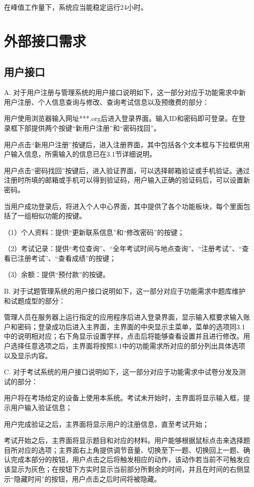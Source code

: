 在峰值工作量下，系统应当能稳定运行24小时。

\section{外部接口需求}

\subsection{用户接口}
A. 对于用户注册与管理系统的用户接口说明如下，这一部分对应于功能需求中新用户注册、个人信息查询与修改、查询考试信息以及预缴费的部分：

用户使用浏览器输入网址***.org后进入登录界面。输入ID和密码即可登录。在登录框下部提供两个按键“新用户注册”和“密码找回”。

用户点击“新用户注册”按键后，进入注册界面，其中包括各个文本框与下拉框供用户输入信息，所需输入的信息已在3.1节详细说明。

用户点击“密码找回”按键后，进入验证界面，可以选择邮箱验证或手机验证。通过注册时所填的邮箱或手机可以得到验证码，用户输入正确的验证码后，可以设置新密码。

当用户成功登录后，将进入个人中心界面，其中提供了各个功能板块，每个里面包括了一组相似功能的按键。

（1）个人资料：提供“更新联系信息”和“修改密码”的按键；
	
（2）考试记录：提供“考位查询”、“全年考试时间与地点查询”、“注册考试”、“查看已注册考试”、“查看成绩”的按键；

（3）余额：提供“预付款”的按键。

B. 对于试题管理系统的用户接口说明如下，这一部分对应于功能需求中题库维护和试题成型的部分：

管理人员在服务器上运行指定的应用程序后进入登录界面，显示输入框要求输入账户和密码；登录成功后进入主界面，主界面的中央显示主菜单，菜单的选项同3.1中的说明相对应；右下角显示设置字样，点击后将能够查看设置并且进行修改。用户选择任意选项之后，主界面将按照3.1中的功能需求所对应的部分列出具体选项以及显示内容。

C. 对于考试系统的用户接口说明如下，这一部分对应于功能需求中试卷分发及测试的部分：

用户将在考场给定的设备上使用本系统。考试未开始时，主界面将显示输入框，提示用户输入验证信息；

用户完成验证之后，主界面将显示用户的注册信息，直至考试开始；

考试开始之后，主界面将显示题目和对应的材料。用户能够根据鼠标点击来选择题目所对应的选项；主界面右上角提供调节音量、切换至下一题、切换回上一题、确认完成本部分的按钮，用户点击之后将触发相应的动作，该动作若当前不可触发应该显示为灰色；在按钮下方实时显示当前部分所剩余的时间，并且在时间的右侧显示“隐藏时间”的按钮，用户点击之后时间将被隐藏。

